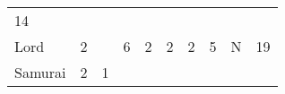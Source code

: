 \documentclass[12pt]{article}
\newcommand{\indexClass}[1]{\index{#1}}
\newcommand{\class}[1]{#1\indexClass{#1}}
\begin{document}
\begin{longtable}[]{@{}llllllllll@{}}
\begin{minipage}[t]{0.08\columnwidth}\raggedright\strut
14
\strut\end{minipage}\tabularnewline
\begin{minipage}[t]{0.13\columnwidth}\raggedright\strut
\class{Lord}
\strut\end{minipage} &
\begin{minipage}[t]{0.06\columnwidth}\raggedright\strut
2
\strut\end{minipage} &
\begin{minipage}[t]{0.06\columnwidth}\raggedright\strut
\strut\end{minipage} &
\begin{minipage}[t]{0.06\columnwidth}\raggedright\strut
6
\strut\end{minipage} &
\begin{minipage}[t]{0.06\columnwidth}\raggedright\strut
2
\strut\end{minipage} &
\begin{minipage}[t]{0.06\columnwidth}\raggedright\strut
2
\strut\end{minipage} &
\begin{minipage}[t]{0.06\columnwidth}\raggedright\strut
2
\strut\end{minipage} &
\begin{minipage}[t]{0.06\columnwidth}\raggedright\strut
5
\strut\end{minipage} &
\begin{minipage}[t]{0.07\columnwidth}\raggedright\strut
N
\strut\end{minipage} &
\begin{minipage}[t]{0.08\columnwidth}\raggedright\strut
19
\strut\end{minipage}\tabularnewline
\begin{minipage}[t]{0.13\columnwidth}\raggedright\strut
\class{Samurai}
\strut\end{minipage} &
\begin{minipage}[t]{0.06\columnwidth}\raggedright\strut
2
\strut\end{minipage} &
\begin{minipage}[t]{0.06\columnwidth}\raggedright\strut
1
\strut\end{minipage} &
\begin{minipage}[t]{0.06\columnwidth}\raggedright\strut
\strut\end{minipage} &
\begin{minipage}[t]{0.06\columnwidth}\raggedright\strut
\strut\end{minipage} &

\end{longtable}
\end{document}
